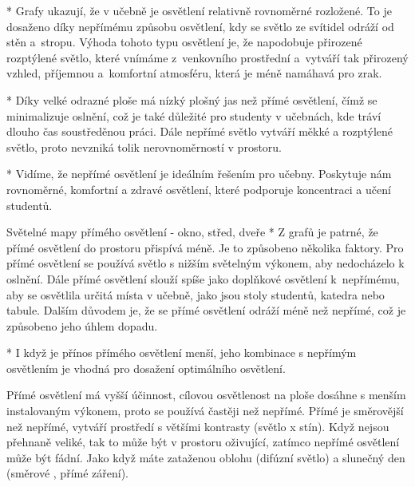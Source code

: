 \begitems
    * Grafy ukazují, že v učebně je osvětlení relativně rovnoměrné rozložené.
    To je dosaženo díky nepřímému způsobu osvětlení, kdy se světlo ze svítidel odráží od stěn a~stropu.
    Výhoda tohoto typu osvětlení je, že napodobuje přirozené rozptýlené světlo, které vnímáme z~venkovního prostřední
    a~vytváří tak přirozený vzhled, příjemnou a~komfortní atmosféru, která je méně namáhavá pro zrak.

    * Díky velké odrazné ploše má nízký plošný jas než přímé osvětlení, čímž se minimalizuje oslnění, což je také důležité pro
    studenty v učebnách, kde tráví dlouho čas soustředěnou práci.
    Dále nepřímé světlo vytváří měkké a rozptýlené světlo, proto nevzniká tolik nerovnoměrností v prostoru.

    * Vidíme, že nepřímé osvětlení je ideálním řešením pro učebny. Poskytuje nám rovnoměrné,
    komfortní a zdravé osvětlení, které podporuje koncentraci a učení studentů.
\enditems

\medskip {} Světelné mapy přímého osvětlení - okno, střed, dveře
\begitems
  *  Z grafů je patrné, že přímé osvětlení do prostoru přispívá méně. Je to způsobeno několika faktory.
    Pro přímé osvětlení se používá světlo s nižším světelným výkonem, aby nedocházelo k oslnění.
    Dále přímé osvětlení slouží spíše jako doplňkové osvětlení k~nepřímému, aby se osvětlila určitá místa v učebně,
    jako jsou stoly studentů, katedra nebo tabule. Dalším důvodem je, že se přímé osvětlení odráží
    méně než nepřímé, což je způsobeno jeho úhlem dopadu.

  *  I když je přínos přímého osvětlení menší, jeho kombinace s nepřímým osvětlením je vhodná pro dosažení
    optimálního osvětlení. 
    

Přímé osvětlení má vyšší účinnost, cílovou osvětlenost na ploše dosáhne s menším instalovaným výkonem,
proto se používá častěji než nepřímé. Přímé je směrovější než nepřímé, vytváří prostředí s většími kontrasty
(světlo x stín). Když nejsou přehnaně veliké, tak to může být v prostoru oživující, zatímco nepřímé osvětlení může být fádní.
Jako když máte zataženou oblohu (difúzní světlo) a slunečný den (směrové , přímé záření).  

